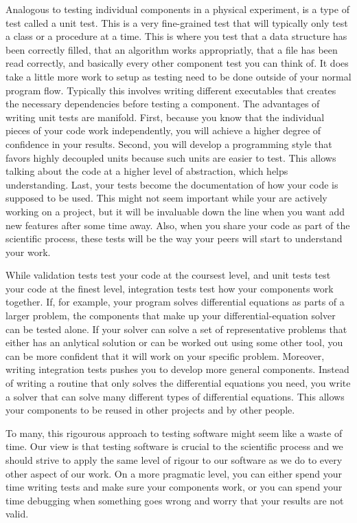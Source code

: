 Analogous to testing individual components in a physical experiment, is a type
of test called a unit test. This is a very fine-grained test that will typically
only test a class or a procedure at a time. This is where you test that a data
structure has been correctly filled, that an algorithm works appropriatly, that
a file has been read correctly, and basically every other component test you can
think of. It does take a little more work to setup as testing need to be done
outside of your normal program flow. Typically this involves writing different
executables that creates the necessary dependencies before testing a component.
The advantages of writing unit tests are manifold. First, because you know that
the individual pieces of your code work independently, you will achieve a higher
degree of confidence in your results. Second, you will develop a programming
style that favors highly decoupled units because such units are easier to test.
This allows talking about the code at a higher level of abstraction, which helps
understanding. Last, your tests become the documentation of how your code is
supposed to be used. This might not seem important while your are actively
working on a project, but it will be invaluable down the line when you want add
new features after some time away. Also, when you share your code as part of the
scientific process, these tests will be the way your peers will start to
understand your work.

While validation tests test your code at the coursest level, and unit tests test
your code at the finest level, integration tests test how your components work
together. If, for example, your program solves differential equations as parts
of a larger problem, the components that make up your differential-equation
solver can be tested alone. If your solver can solve a set of representative
problems that either has an anlytical solution or can be worked out using some
other tool, you can be more confident that it will work on your specific
problem.  Moreover, writing integration tests pushes you to develop more general
components. Instead of writing a routine that only solves the differential
equations you need, you write a solver that can solve many different types of
differential equations. This allows your components to be reused in other
projects and by other people.

To many, this rigourous approach to testing software might seem like a waste of
time. Our view is that testing software is crucial to the scientific process and
we should strive to apply the same level of rigour to our software as we do to
every other aspect of our work. On a more pragmatic level, you can either spend
your time writing tests and make sure your components work, or you can spend
your time debugging when something goes wrong and worry that your results are
not valid.

